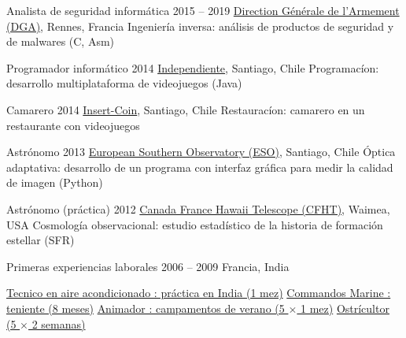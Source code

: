 \begin{joblist}[12.8][8.4][4]

\setlength{\parskip}{0.25cm}
\vspace{-0.4cm}

\item[Analista de seguridad informática]{2015 -- 2019}
	{
  \href{http://www.defense.gouv.fr/dga/}{Direction Générale de l'Armement (DGA)}, Rennes, Francia
	}
  {Ingeniería inversa: análisis de productos de seguridad y de malwares (C, Asm)}


\item[Programador informático]{2014}
	{
	\href{https://tinmarino.github.io/Page/}{Independiente}, Santiago, Chile
	}
	{Programacíon: desarrollo multiplataforma de videojuegos (Java)}


\item[Camarero]{2014}
	{
	\href{http://www.insertcoin.cl/}{Insert-Coin}, Santiago, Chile
	}
	{Restauracíon: camarero en un restaurante con videojuegos}


\item[Astrónomo]{2013}
	{
	\href{http://www.eso.org/public/}{European Southern Observatory (ESO)}, Santiago, Chile
	}
  {Óptica adaptativa: desarrollo de un programa con interfaz gráfica para medir la calidad de imagen (Python)}

\item[Astrónomo (práctica)]{2012}
	{
\href{https://www.cfht.hawaii.edu/}{Canada France Hawaii Telescope (CFHT)}, Waimea, USA
  }
  {Cosmología observacional: estudio estadístico de la historia de formación estellar (SFR)}
	
\item[Primeras experiencias laborales]{2006 -- 2009}
	{
	Francia, India
	}
	{
    \renewcommand\labelitemi{{}}
		\vspace{-0.8cm}
    \setlength{\parskip}{0cm}
		\begin{itemize}
		\setlength\itemsep{0cm}
    \cvitem \href{http://www.dupont.co.in/}{ Tecnico en aire acondicionado : práctica en India (1 mez)}
    \cvitem \href{http://www.defense.gouv.fr/marine/organisation/forces/fusiliers-marins-et-commandos/force-maritime-des-fusiliers-marins-et-commandos}{ Commandos Marine : teniente (8 meses)}
    \cvitem \href{http://www.vacances-pour-tous.org/}{ Animador : campamentos de verano (5 $\times$ 1 mez)}
    \cvitem \href{http://huitresdesaintvaast.fr/}{ Ostrícultor (5 $\times$ 2 semanas)}
		\end{itemize}
  }

	
\end{joblist}



